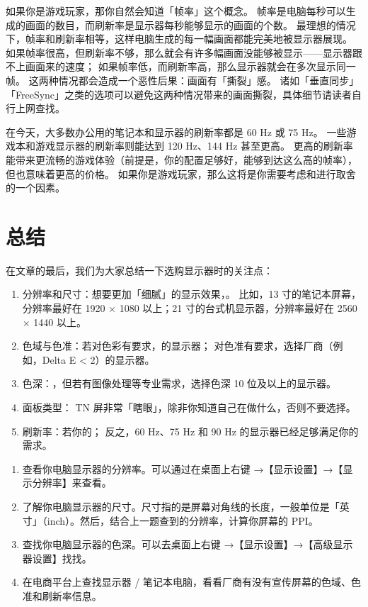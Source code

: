 如果你是游戏玩家，那你自然会知道「帧率」这个概念。
帧率是电脑每秒可以生成的画面的数目，而刷新率是显示器每秒能够显示的画面的个数。
最理想的情况下，帧率和刷新率相等，这样电脑生成的每一幅画面都能完美地被显示器展现。
如果帧率很高，但刷新率不够，那么就会有许多幅画面没能够被显示——显示器跟不上画面来的速度；
如果帧率低，而刷新率高，那么显示器就会在多次显示同一帧。
这两种情况都会造成一个恶性后果：画面有「撕裂」感。
诸如「垂直同步」「FreeSync」之类的选项可以避免这两种情况带来的画面撕裂，具体细节请读者自行上网查找。

在今天，大多数办公用的笔记本和显示器的刷新率都是 60 Hz 或 75 Hz。
一些游戏本和游戏显示器的刷新率则能达到 120 Hz、144 Hz 甚至更高。
更高的刷新率能带来更流畅的游戏体验（前提是，你的配置足够好，能够到达这么高的帧率），但也意味着更高的价格。
如果你是游戏玩家，那么这将是你需要考虑和进行取舍的一个因素。

\section{总结}

在文章的最后，我们为大家总结一下选购显示器时的关注点：

\begin{enumerate}
  \item 分辨率和尺寸：想要更加「细腻」的显示效果，。
    比如，13 寸的笔记本屏幕，分辨率最好在 1920 × 1080 以上；21 寸的台式机显示器，分辨率最好在 2560 × 1440 以上。
  \item 色域与色准：若对色彩有要求，的显示器；
    对色准有要求，选择厂商（例如，Delta E < 2）的显示器。
  \item 色深：，但若有图像处理等专业需求，选择色深 10 位及以上的显示器。
  \item 面板类型：
    TN 屏非常「瞎眼」，除非你知道自己在做什么，否则不要选择。
  \item 刷新率：若你的；
    反之，60 Hz、75 Hz 和 90 Hz 的显示器已经足够满足你的需求。
\end{enumerate}

\practice

\begin{enumerate}
  \item 查看你电脑显示器的分辨率。可以通过在桌面上右键 →【显示设置】→【显示分辨率】来查看。
  \item 了解你电脑显示器的尺寸。尺寸指的是屏幕对角线的长度，一般单位是「英寸」（inch）。然后，结合上一题查到的分辨率，计算你屏幕的 PPI。
  \item 查找你电脑显示器的色深。可以去桌面上右键 →【显示设置】→【高级显示器设置】找找。
  \item 在电商平台上查找显示器 / 笔记本电脑，看看厂商有没有宣传屏幕的色域、色准和刷新率信息。
\end{enumerate}